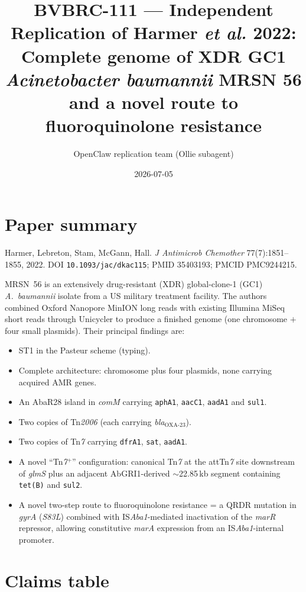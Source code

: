 \documentclass[11pt]{article}
\title{BVBRC-111 --- Independent Replication of Harmer \emph{et al.} 2022:\\
       Complete genome of XDR GC1 \emph{Acinetobacter baumannii} MRSN 56\\
       and a novel route to fluoroquinolone resistance}
\author{OpenClaw replication team (Ollie subagent)}
\date{2026-07-05}
\begin{document}
\maketitle

\section{Paper summary}

Harmer, Lebreton, Stam, McGann, Hall.
\emph{J Antimicrob Chemother} 77(7):1851--1855, 2022.
DOI \texttt{10.1093/jac/dkac115}; PMID 35403193; PMCID PMC9244215.

MRSN~56 is an extensively drug-resistant (XDR) global-clone-1 (GC1)
\emph{A.~baumannii} isolate from a US military treatment facility.
The authors combined Oxford Nanopore MinION long reads with existing
Illumina MiSeq short reads through Unicycler to produce a finished
genome (one chromosome $+$ four small plasmids).  Their principal
findings are:

\begin{itemize}[nosep]
  \item ST1 in the Pasteur scheme (typing).
  \item Complete architecture: chromosome plus four plasmids, none carrying
        acquired AMR genes.
  \item An AbaR28 island in \emph{comM} carrying \texttt{aphA1},
        \texttt{aacC1}, \texttt{aadA1} and \texttt{sul1}.
  \item Two copies of Tn\emph{2006} (each carrying \emph{bla}$_{\text{OXA-23}}$).
  \item Two copies of Tn\emph{7} carrying \texttt{dfrA1}, \texttt{sat},
        \texttt{aadA1}.
  \item A novel ``Tn\emph{7}$^{+}$'' configuration: canonical Tn\emph{7}
        at the attTn\emph{7} site downstream of \emph{glmS} plus an
        adjacent AbGRI1-derived $\sim$22.85\,kb segment containing
        \texttt{tet(B)} and \texttt{sul2}.
  \item A novel two-step route to fluoroquinolone resistance =
        a QRDR mutation in \emph{gyrA} (\emph{S83L}) combined with
        IS\emph{Aba1}-mediated inactivation of the \emph{marR}
        repressor, allowing constitutive \emph{marA} expression from an
        IS\emph{Aba1}-internal promoter.
\end{itemize}

\section{Claims table}
\end{document}
